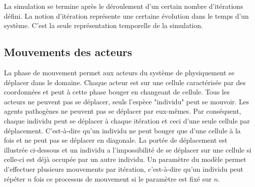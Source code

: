 La simulation se termine après le déroulement d'un certain nombre d'itérations défini. La notion d'itération représente une certaine évolution dans le temps d'un système. C'est la seule représentation temporelle de la simulation.

\subsection{Mouvements des acteurs}

La phase de mouvement permet aux acteurs du système de physiquement se déplacer dans le domaine. Chaque acteur est sur une cellule caractérisée par des coordonnées et peut à cette phase bouger en changeant de cellule. Tous les acteurs ne peuvent pas se déplacer, seuls l'espèce "individu" peut se mouvoir. Les agents pathogènes ne peuvent pas se déplacer par eux-mêmes. Par conséquent, chaque individu peut se déplacer à chaque itération et ceci d'une seule cellule par déplacement. C'est-à-dire qu'un individu ne peut bouger que d'une cellule à la fois et ne peut pas se déplacer en diagonale. La portée de déplacement est illustrée ci-dessous et un individu a l'impossibilité de se déplacer sur une cellule si celle-ci est déjà occupée par un autre individu. Un paramètre du modèle permet d'effectuer plusieurs mouvements par itération, c'est-à-dire qu'un individu peut répéter $n$ fois ce processus de mouvement si le paramètre est fixé sur $n$.\\

